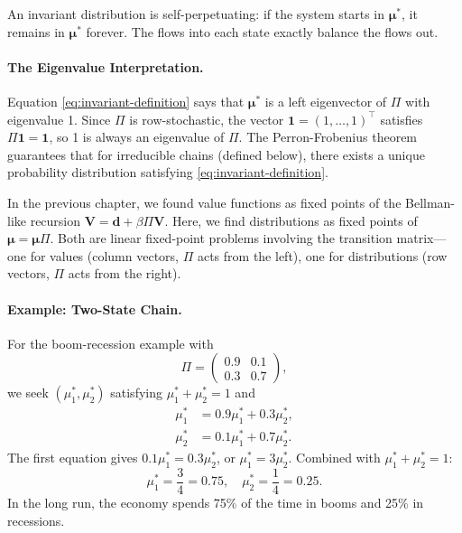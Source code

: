 An invariant distribution is self-perpetuating: if the system starts in $\boldsymbol{\mu}^*$, it remains in $\boldsymbol{\mu}^*$ forever. The flows into each state exactly balance the flows out.

\paragraph{The Eigenvalue Interpretation.}
Equation \eqref{eq:invariant-definition} says that $\boldsymbol{\mu}^*$ is a left eigenvector of $\Pi$ with eigenvalue 1. Since $\Pi$ is row-stochastic, the vector $\mathbf{1} = (1, \ldots, 1)^\top$ satisfies $\Pi \mathbf{1} = \mathbf{1}$, so 1 is always an eigenvalue of $\Pi$. The Perron-Frobenius theorem guarantees that for irreducible chains (defined below), there exists a unique probability distribution satisfying \eqref{eq:invariant-definition}.

\begin{calloutimportant}
In the previous chapter, we found value functions as fixed points of the Bellman-like recursion $\mathbf{V} = \mathbf{d} + \beta \Pi \mathbf{V}$. Here, we find distributions as fixed points of $\boldsymbol{\mu} = \boldsymbol{\mu} \Pi$. Both are linear fixed-point problems involving the transition matrix---one for values (column vectors, $\Pi$ acts from the left), one for distributions (row vectors, $\Pi$ acts from the right).
\end{calloutimportant}

\paragraph{Example: Two-State Chain.}
For the boom-recession example with
\begin{equation}
\Pi = \begin{pmatrix}
0.9 & 0.1 \\
0.3 & 0.7
\end{pmatrix},
\label{eq:two-state-recall}
\end{equation}
we seek $(\mu_1^*, \mu_2^*)$ satisfying $\mu_1^* + \mu_2^* = 1$ and
\begin{align}
\mu_1^* &= 0.9 \mu_1^* + 0.3 \mu_2^*, \\
\mu_2^* &= 0.1 \mu_1^* + 0.7 \mu_2^*.
\end{align}
The first equation gives $0.1 \mu_1^* = 0.3 \mu_2^*$, or $\mu_1^* = 3 \mu_2^*$. Combined with $\mu_1^* + \mu_2^* = 1$:
\begin{equation}
\mu_1^* = \frac{3}{4} = 0.75, \quad \mu_2^* = \frac{1}{4} = 0.25.
\label{eq:two-state-invariant}
\end{equation}
In the long run, the economy spends 75\% of the time in booms and 25\% in recessions.

